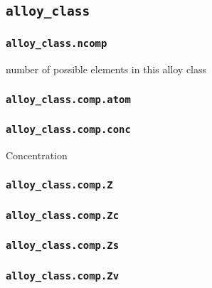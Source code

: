 \subsection{\texttt{alloy\_class}}
\subsubsection{\texttt{alloy\_class.ncomp}}
number of possible elements in this alloy class
\subsubsection{\texttt{alloy\_class.comp.atom}}
\subsubsection{\texttt{alloy\_class.comp.conc}}
Concentration
\subsubsection{\texttt{alloy\_class.comp.Z}}
\subsubsection{\texttt{alloy\_class.comp.Zc}}
\subsubsection{\texttt{alloy\_class.comp.Zs}}
\subsubsection{\texttt{alloy\_class.comp.Zv}}


